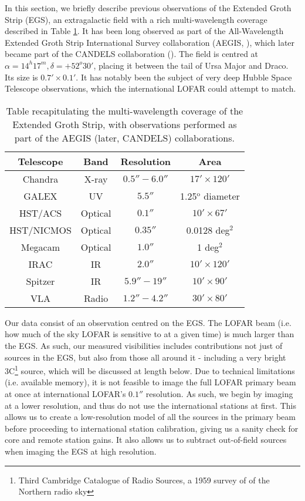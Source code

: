 \pg
In this section, we briefly describe previous observations of the Extended Groth Strip (EGS), an extragalactic field with a rich multi-wavelength coverage described in Table \ref{table.EGS.observation}. It has been long observed as part of the All-Wavelength Extended Groth Strip International Survey collaboration (AEGIS, ), which later became part of the CANDELS collaboration (). The field is centred at $\alpha=14^h17^m,\delta=+52^o 30'$, placing it between the tail of Ursa Major and Draco. Its size is $0.7'\times 0.1'$. It has notably been the subject of very deep Hubble Space Telescope observations, which the international LOFAR could attempt to match. 

\begin{table}[h!]
\begin{tabular}{cccc}
Telescope    & Band    & Resolution  & Area \\\hline
Chandra      & X-ray   & $0.5''-6.0''$ & $17'\times 120'$ \\
GALEX        & UV      & $5.5''      $ & 1.25$^\text{o}$ diameter \\
HST/ACS      & Optical & $0.1''      $ & $10' \times 67'$\\
HST/NICMOS   & Optical & $0.35''     $ & 0.0128 deg$^2$\\
Megacam      & Optical & $1.0''      $ & 1 deg$^2$\\
IRAC         & IR      & $2.0''      $ & $10' \times 120'$ \\
Spitzer      & IR      & $5.9''-19'' $ & $10'\times 90'$\\
VLA          & Radio   & $1.2''-4.2''$ & $30' \times 80'$
\end{tabular}
\caption{\label{table.EGS.observation}Table recapitulating the multi-wavelength coverage of the Extended Groth Strip, with observations performed as part of the AEGIS (later, CANDELS) collaborations.}
\end{table}


\pg
Our data consist of an observation centred on the EGS. The LOFAR beam (i.e. how much of the sky LOFAR is sensitive to at a given time) is much larger than the EGS. As such, our measured visibilities includes contributions not just of sources in the EGS, but also from those all around it - including a very bright 3C\footnote{Third Cambridge Catalogue of Radio Sources, a 1959 survey of of the Northern radio sky}  source, which will be discussed at length below. Due to technical limitations (i.e. available memory), it is not feasible to image the full LOFAR primary beam at once at international LOFAR's  $0.1''$ resolution. As such, we begin by imaging at a lower resolution, and thus do not use the international stations at first. This allows us to create a low-resolution model of all the sources in the primary beam before proceeding to international station calibration, giving us a sanity check for core and remote station gains. It also allows us to subtract out-of-field sources when imaging the EGS at high resolution.

